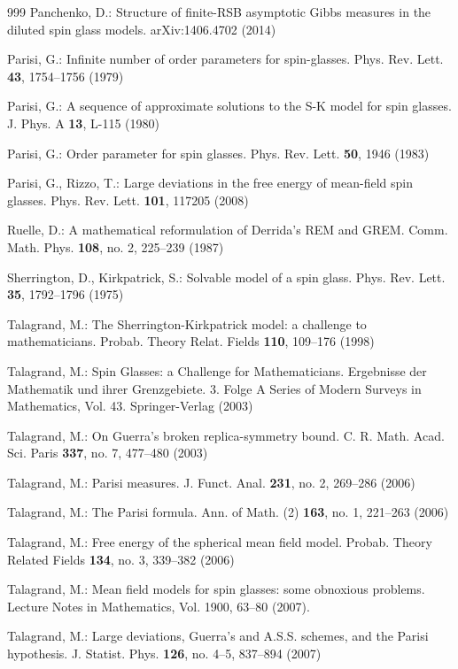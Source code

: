 \documentclass[12pt]{article}
\theoremstyle{nonumberplain}
\begin{document}
\begin{thebibliography}{999}
 Panchenko, D.: Structure of finite-RSB asymptotic Gibbs measures in the diluted spin glass models. arXiv:1406.4702 (2014)

 Parisi, G.: Infinite number of order parameters for spin-glasses. Phys. Rev. Lett. \textbf{43}, 1754--1756 (1979)

 Parisi, G.: A sequence of approximate solutions to the S-K model for spin glasses. J. Phys. A \textbf{13}, L-115 (1980) 

 Parisi, G.: Order parameter for spin glasses. Phys. Rev. Lett. \textbf{50}, 1946 (1983) 

 Parisi, G., Rizzo, T.: Large deviations in the free energy of mean-field spin glasses.
Phys. Rev. Lett. \textbf{101}, 117205 (2008)

 Ruelle, D.: A mathematical reformulation of Derrida's REM and GREM.  Comm. Math. Phys.  {\bf 108},  no. 2, 225--239 (1987)

 Sherrington, D., Kirkpatrick, S.: Solvable model of a spin glass. Phys. Rev. Lett. {\bf 35}, 1792--1796 (1975)

 Talagrand, M.: The Sherrington-Kirkpatrick model: a challenge to mathematicians. Probab. Theory Relat. Fields \textbf{110}, 109--176 (1998)

 Talagrand, M.:   Spin Glasses: a Challenge for Mathematicians.  Ergebnisse der Mathematik und ihrer Grenzgebiete. 3. Folge A Series of Modern Surveys in Mathematics, Vol. 43. Springer-Verlag (2003) 

 Talagrand, M.:  On Guerra's broken replica-symmetry bound.  C. R. Math. Acad. Sci. Paris {\bf 337}, no. 7, 477--480 (2003)

 Talagrand, M.: Parisi measures.  J. Funct. Anal. \textbf{231}, no. 2, 269--286 (2006)

 Talagrand, M.: The Parisi formula. Ann. of Math. (2) \textbf{163}, no. 1, 221--263 (2006)

 Talagrand, M.: Free energy of the spherical mean field model. Probab. Theory Related Fields  \textbf{134}, no. 3, 339--382 (2006) 

 Talagrand, M.: Mean field models for spin glasses: some obnoxious problems. Lecture Notes in Mathematics, Vol. 1900, 63--80 (2007).

 Talagrand, M.: Large deviations, Guerra's and A.S.S. schemes, and the Parisi hypothesis. J. Statist. Phys. \textbf{126}, no. 4--5, 837--894 (2007)


\end{thebibliography}
\end{document}
